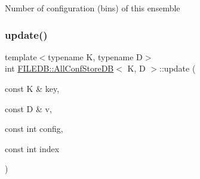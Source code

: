 Number of configuration (bins) of this ensemble \mbox{\label{classFILEDB_1_1AllConfStoreDB_a3beaa117f0ddf32de13d5f96643b626c}} 
\subsubsection{\texorpdfstring{update()}{update()}\hspace{0.1cm}{\footnotesize\ttfamily [1/2]}}
{\footnotesize\ttfamily template$<$typename K, typename D$>$ \\
int \mbox{\hyperlink{classFILEDB_1_1AllConfStoreDB}{F\+I\+L\+E\+D\+B\+::\+All\+Conf\+Store\+DB}}$<$ K, D $>$\+::update (\begin{DoxyParamCaption}\item[{const K \&}]{key,  }\item[{const D \&}]{v,  }\item[{const int}]{config,  }\item[{const int}]{index }\end{DoxyParamCaption})\hspace{0.3cm}{\ttfamily [inline]}}

